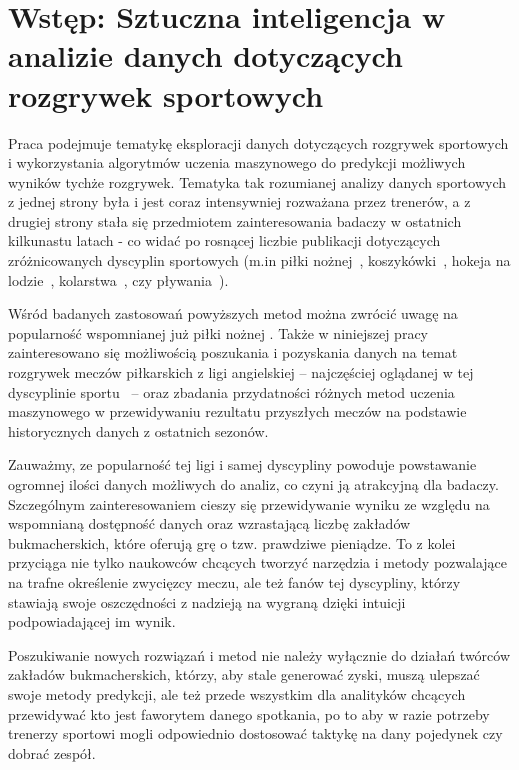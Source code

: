 
\chapter{Wstęp: Sztuczna inteligencja w analizie danych dotyczących rozgrywek sportowych}

\noindent Praca podejmuje tematykę eksploracji danych dotyczących rozgrywek sportowych i wykorzystania algorytmów uczenia maszynowego do predykcji możliwych wyników tychże rozgrywek. Tematyka tak rozumianej analizy danych sportowych z jednej strony była i jest coraz intensywniej rozważana przez trenerów, a z drugiej strony stała się przedmiotem zainteresowania badaczy w ostatnich kilkunastu latach - co widać po rosnącej liczbie publikacji dotyczących zróżnicowanych dyscyplin sportowych (m.in piłki nożnej~\cite{Euro2016-1}, koszykówki~\cite{basketball}, hokeja na lodzie~\cite{ice-hockey}, kolarstwa~\cite{cyclists}, czy pływania~\cite{swimming}). 

Wśród badanych zastosowań powyższych metod można zwrócić uwagę na popularność wspomnianej już piłki nożnej \cite{Euro2016-1} \cite{Euro2016-2} \cite{Euro2016-3} \cite{soccer_players_skill} \cite{ml_soccer_analytics}. Także w niniejszej pracy zainteresowano się możliwością poszukania i pozyskania danych na temat rozgrywek meczów piłkarskich z ligi angielskiej -- najczęściej oglądanej w tej dyscyplinie sportu~\cite{ESPN} -- oraz zbadania przydatności różnych metod uczenia maszynowego w przewidywaniu rezultatu przyszłych meczów na podstawie historycznych danych z ostatnich sezonów. 

Zauważmy, ze popularność tej ligi i samej dyscypliny powoduje powstawanie ogromnej ilości danych możliwych do analiz, co czyni ją atrakcyjną dla badaczy. Szczególnym zainteresowaniem cieszy się przewidywanie wyniku ze względu na wspomnianą dostępność danych oraz wzrastającą liczbę zakładów bukmacherskich, które oferują grę o tzw. prawdziwe pieniądze. To z kolei przyciąga nie tylko naukowców chcących tworzyć narzędzia i metody pozwalające na trafne określenie zwycięzcy meczu, ale też fanów tej dyscypliny, którzy stawiają swoje oszczędności z nadzieją na wygraną dzięki  intuicji podpowiadającej im wynik. 

Poszukiwanie nowych rozwiązań i metod nie należy wyłącznie do działań  twórców zakładów bukmacherskich, którzy, aby stale generować zyski, muszą ulepszać swoje metody predykcji, ale też przede wszystkim dla analityków chcących przewidywać kto jest faworytem danego spotkania, po to aby w razie potrzeby trenerzy sportowi mogli odpowiednio dostosować taktykę na dany pojedynek czy dobrać zespół.

